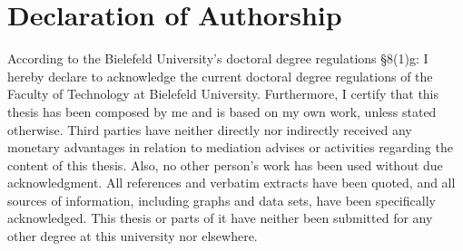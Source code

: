 \chapter*{Declaration of Authorship}
\thispagestyle{empty}

According to the Bielefeld University's doctoral degree regulations \S{}8(1)g: I hereby declare to acknowledge the current doctoral degree regulations of the Faculty of Technology at Bielefeld University. %
Furthermore, I certify that this thesis has been composed by me and is based on my own work, unless stated otherwise.
Third parties have neither directly nor indirectly received any monetary advantages in relation to mediation advises or activities regarding the content of this thesis.
Also, no other person's work has been used without due acknowledgment.
All references and verbatim extracts have been quoted, and all sources of information, including graphs and data sets, have been specifically acknowledged.
This thesis or parts of it have neither been submitted for any other degree at this university nor elsewhere.

\SignatureAndDate{\myName}
